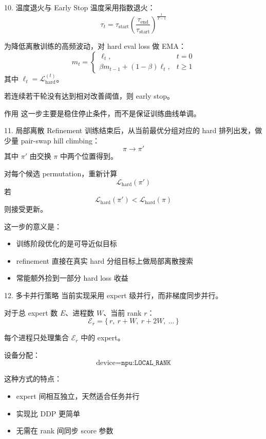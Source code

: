 \documentclass[aspectratio=169,professionalfonts]{ctexbeamer}
\newcommand{\Loss}{\mathcal{L}}
\begin{document}
\begin{frame}{10. 温度退火与 Early Stop}
  温度采用指数退火：
  \[
    \tau_t
    =
    \tau_{\mathrm{start}}
    \left(
      \frac{\tau_{\mathrm{end}}}{\tau_{\mathrm{start}}}
    \right)^{\frac{t}{T-1}}
  \]

  \vspace{0.4em}
  为降低离散训练的高频波动，对 hard eval loss 做 EMA：
  \[
    m_t =
    \begin{cases}
      \ell_t, & t=0\\
      \beta m_{t-1} + (1-\beta)\ell_t, & t\ge 1
    \end{cases}
  \]
  其中 $\ell_t=\Loss_{\mathrm{hard}}^{(t)}$。

  \vspace{0.4em}
  若连续若干轮没有达到相对改善阈值，则 early stop。

  \begin{block}{作用}
    这一步主要是稳住停止条件，而不是保证训练曲线单调。
  \end{block}
\end{frame}

\begin{frame}{11. 局部离散 Refinement}
  训练结束后，从当前最优分组对应的 hard 排列出发，做少量 pair-swap hill climbing：
  \[
    \pi \rightarrow \pi'
  \]
  其中 $\pi'$ 由交换 $\pi$ 中两个位置得到。

  对每个候选 permutation，重新计算
  \[
    \Loss_{\mathrm{hard}}(\pi')
  \]
  若
  \[
    \Loss_{\mathrm{hard}}(\pi') < \Loss_{\mathrm{hard}}(\pi)
  \]
  则接受更新。

  \vspace{0.4em}
  这一步的意义是：
  \begin{itemize}
    \item 训练阶段优化的是可导近似目标
    \item refinement 直接在真实 hard 分组目标上做局部离散搜索
    \item 常能额外捡到一部分 hard loss 收益
  \end{itemize}
\end{frame}

\begin{frame}{12. 多卡并行策略}
  当前实现采用 expert 级并行，而非梯度同步并行。

  对于总 expert 数 $E$、进程数 $W$、当前 rank $r$：
  \[
    \mathcal{E}_r = \{\, r,\ r+W,\ r+2W,\ \dots \,\}
  \]

  每个进程只处理集合 $\mathcal{E}_r$ 中的 expert。

  \vspace{0.5em}
  设备分配：
  \[
    \text{device} = \texttt{npu:LOCAL\_RANK}
  \]

  这种方式的特点：
  \begin{itemize}
    \item expert 间相互独立，天然适合任务并行
    \item 实现比 DDP 更简单
    \item 无需在 rank 间同步 score 参数
  \end{itemize}
\end{frame}
\end{document}
